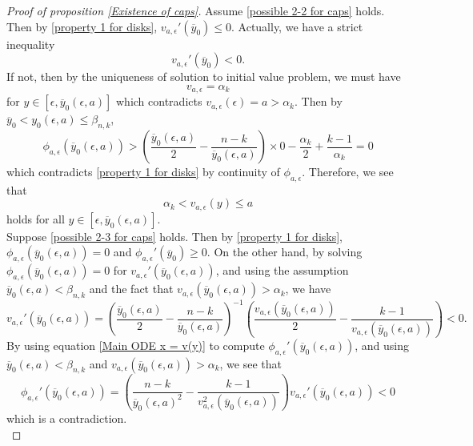 \documentclass[pdflatex,sn-mathphys-num]{sn-jnl}
\begin{document}
\begin{proof}[Proof of proposition \ref{Existence of caps}]
Assume \eqref{possible 2-2 for caps} holds. Then by \eqref{property 1 for disks}, $v_{a, \epsilon}'(\overline{y}_0) \leq 0$. Actually, we have a strict inequality
\begin{equation}
    v_{a, \epsilon}'(\overline{y}_0) < 0.
\end{equation}
If not, then by the uniqueness of solution to initial value problem, we must have
 $$v_{a, \epsilon} = \alpha_k$$
 for $y \in [\epsilon, \overline{y}_0(\epsilon, a)]$ which contradicts $v_{a, \epsilon}(\epsilon) = a > \alpha_k$. 
 Then by $\overline{y}_0 < y_0(\epsilon, a) \leq \beta_{n,k}$,
\begin{equation}
    \phi_{a, \epsilon}(\overline{y}_0(\epsilon, a)) > (\frac{\overline{y}_0(\epsilon, a)}{2} - \frac{n-k}{\overline{y}_0(\epsilon, a)})\times 0 - \frac{\alpha_k{}}{2} + \frac{k-1}{\alpha_k} =0
\end{equation}
which contradicts \eqref{property 1 for disks} by continuity of $\phi_{a, \epsilon}$. Therefore, we see that 
\begin{equation}
    \alpha_k < v_{a, \epsilon}(y) \leq a
\end{equation}
holds for all $y \in [\epsilon, \overline{y}_0(\epsilon, a)]$.\\

Suppose \eqref{possible 2-3 for caps} holds. Then by \eqref{property 1 for disks}, $\phi_{a, \epsilon}(\overline{y}_0(\epsilon, a)) = 0$ and $\phi_{a, \epsilon}'(\overline{y}_0) \geq 0$. On the other hand, by solving $\phi_{a, \epsilon}(\overline{y}_0(\epsilon, a)) = 0$ for $v_{a, \epsilon}'(\overline{y}_0(\epsilon, a))$, and using the assumption $\overline{y}_0(\epsilon, a) < \beta_{n,k}$ and the fact that $v_{a, \epsilon}(\overline{y}_0(\epsilon, a)) > \alpha_k$, we have
$$v_{a, \epsilon}'(\overline{y}_0(\epsilon, a)) = (\frac{\overline{y}_0(\epsilon, a)}{2} - \frac{n-k}{\overline{y}_0(\epsilon, a)})^{-1}(\frac{v_{a, \epsilon}(\overline{y}_0(\epsilon, a))}{2} - \frac{k-1}{v_{a, \epsilon}(\overline{y}_0(\epsilon, a))}) < 0.$$
By using equation \eqref{Main ODE x = v(y)} to compute $\phi_{a, \epsilon}'(\overline{y}_0(\epsilon, a))$, and using $\overline{y}_0(\epsilon, a) < \beta_{n,k}$ and $v_{a, \epsilon}(\overline{y}_0(\epsilon, a)) > \alpha_k$, we see that
\begin{equation}
  \phi_{a, \epsilon} '(\overline{y}_0(\epsilon, a)) = (\frac{n - k}{\overline{y}_0(\epsilon, a)^2} - \frac{k-1}{v_{a, \epsilon}^2(\overline{y}_0(\epsilon, a))})v_{a, \epsilon}'(\overline{y}_0(\epsilon, a)) < 0  
\end{equation}
which is a contradiction. \\


\end{proof}
\end{document}
